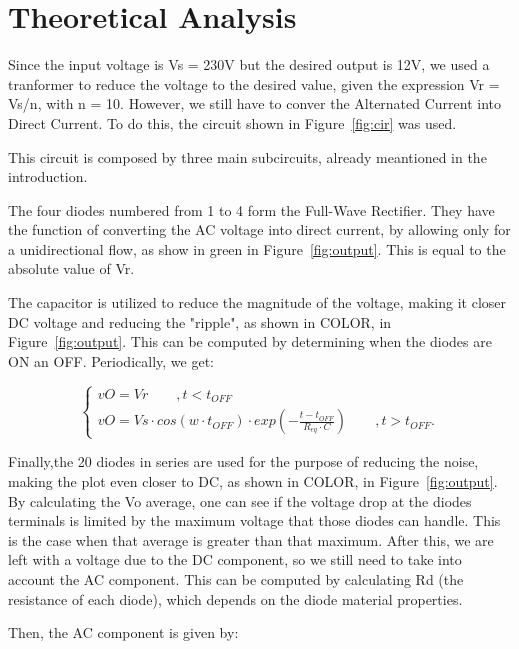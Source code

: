 \section{Theoretical Analysis}
\label{sec:analysis}

Since the input voltage is Vs = 230V but the desired output is 12V, we used a tranformer to reduce the voltage to the desired value, given the expression Vr = Vs/n, with n = 10. However,
we still have to conver the Alternated Current into Direct Current. To do this, the circuit shown in Figure~\ref{fig:cir} was used.

This circuit is composed by three main subcircuits, already meantioned in the introduction. 

The four diodes numbered from 1 to 4 form the Full-Wave Rectifier. They have the function of converting the AC voltage into direct current, by allowing only for a unidirectional flow, as show in green in
 Figure~\ref{fig:output}. This is equal to the absolute value of Vr. 

The capacitor is utilized to reduce the magnitude of the voltage, making it closer DC voltage and reducing the "ripple", as shown in COLOR, in Figure~\ref{fig:output}.
This can be computed by determining when the diodes are ON an OFF. Periodically, we get:

\begin{equation}
    \begin{cases}
        vO = Vr \qquad , t < t_{OFF} \\
	    vO = Vs \cdot cos(w \cdot t_{OFF}) \cdot exp(-\frac{t-t_{OFF}}{R_{eq} \cdot C}) \qquad , t > t_{OFF}.
    
  \label{eq:vo}  
  \end{cases}
\end{equation}


Finally,the 20 diodes in series are used for the purpose of reducing the noise, making the plot even closer to DC, as shown in COLOR, in Figure~\ref{fig:output}.
 By calculating the Vo average, one can see if the voltage drop at the diodes terminals is limited by the maximum voltage that those diodes can handle. 
This is the case when that average is greater than that maximum. After this, we are left with a voltage due to the DC component, 
so we still need to take into account the AC component. This can be computed by calculating Rd (the resistance of each diode), which depends on the diode material properties.

Then, the AC component is given by:

